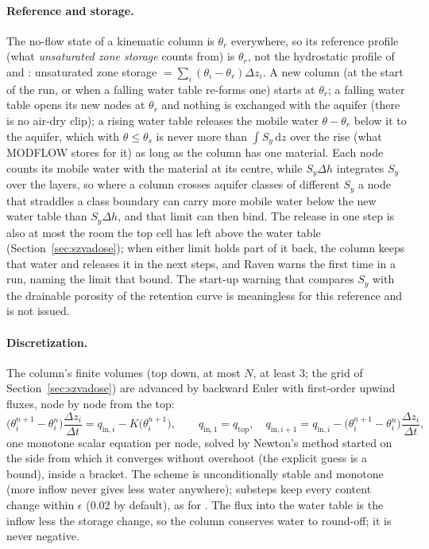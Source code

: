 \paragraph{Reference and storage.} The no-flow state of a kinematic column is $\theta_r$ everywhere, so its reference
profile (what \emph{unsaturated zone storage} counts from) is $\theta_r$, not the hydrostatic profile of
 and : unsaturated zone storage $=\sum_i(\theta_i-\theta_r)\Delta z_i$. A new column (at the
start of the run, or when a falling water table re-forms one) starts at $\theta_r$; a falling water table opens its new
nodes at $\theta_r$ and nothing is exchanged with the aquifer (there is no air-dry clip); a rising water table releases
the mobile water $\theta-\theta_r$ below it to the aquifer, which with $\theta\le\theta_s$ is never more than
$\int S_y\,\mathrm{d}z$ over the rise (what MODFLOW stores for it) as long as the column has one material. Each node
counts its mobile water with the material at its centre, while $S_y\Delta h$ integrates $S_y$ over the layers, so where
a column crosses aquifer classes of different $S_y$ a node that straddles a class boundary can carry more mobile water
below the new water table than $S_y\Delta h$, and that limit can then bind. The release in one step is also at most the
room the top cell has left above the water table (Section~\ref{sec:szvadose}); when either limit holds part of it back,
the column keeps that water and releases it in the next steps, and Raven warns the first time in a run, naming the limit
that bound. The start-up warning that compares $S_y$ with the drainable porosity of the retention curve is meaningless
for this reference and is not issued.

\paragraph{Discretization.} The column's finite volumes (top down, at most $N$, at least 3; the grid of
Section~\ref{sec:szvadose}) are advanced by backward Euler with first-order upwind fluxes, node by node from the top:
\begin{equation}
\big(\theta_i^{n+1}-\theta_i^{n}\big)\frac{\Delta z_i}{\Delta t}=q_{\mathrm{in},i}-K\big(\theta_i^{n+1}\big),\qquad
q_{\mathrm{in},1}=q_{\mathrm{top}},\quad q_{\mathrm{in},i+1}=q_{\mathrm{in},i}-\big(\theta_i^{n+1}-\theta_i^{n}\big)\frac{\Delta z_i}{\Delta t},
\end{equation}
one monotone scalar equation per node, solved by Newton's method started on the side from which it converges without
overshoot (the explicit guess is a bound), inside a bracket. The scheme is unconditionally stable and monotone (more
inflow never gives less water anywhere); substeps keep every content change within $\epsilon$ (0.02 by default), as for
. The flux into the water table is the inflow less the storage change, so the column conserves water to
round-off; it is never negative.

